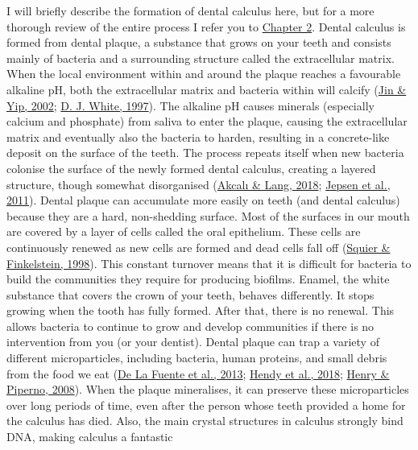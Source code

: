 \documentclass[
  b5paper,
]{book}
\begin{document}
I will briefly describe the formation of dental calculus here, but for a
more thorough review of the entire process I refer you to
\protect\hyperlink{chap-background}{Chapter 2}. Dental calculus is
formed from dental plaque, a substance that grows on your teeth and
consists mainly of bacteria and a surrounding structure called the
extracellular matrix. When the local environment within and around the
plaque reaches a favourable alkaline pH, both the extracellular matrix
and bacteria within will calcify
(\protect\hyperlink{ref-jinSupragingivalCalculus2002}{Jin \& Yip, 2002};
\protect\hyperlink{ref-whiteDentalCalculus1997}{D. J. White, 1997}). The
alkaline pH causes minerals (especially calcium and phosphate) from
saliva to enter the plaque, causing the extracellular matrix and
eventually also the bacteria to harden, resulting in a concrete-like
deposit on the surface of the teeth. The process repeats itself when new
bacteria colonise the surface of the newly formed dental calculus,
creating a layered structure, though somewhat disorganised
(\protect\hyperlink{ref-akcaliDentalCalculus2018}{Akcalı \& Lang, 2018};
\protect\hyperlink{ref-jepsenCalculusRemoval2011}{Jepsen et al., 2011}).
Dental plaque can accumulate more easily on teeth (and dental calculus)
because they are a hard, non-shedding surface. Most of the surfaces in
our mouth are covered by a layer of cells called the oral epithelium.
These cells are continuously renewed as new cells are formed and dead
cells fall off (\protect\hyperlink{ref-squierOralMucosa1998}{Squier \&
Finkelstein, 1998}). This constant turnover means that it is difficult
for bacteria to build the communities they require for producing
biofilms. Enamel, the white substance that covers the crown of your
teeth, behaves differently. It stops growing when the tooth has fully
formed. After that, there is no renewal. This allows bacteria to
continue to grow and develop communities if there is no intervention
from you (or your dentist). Dental plaque can trap a variety of
different microparticles, including bacteria, human proteins, and small
debris from the food we eat
(\protect\hyperlink{ref-delafuenteDNAHuman2013}{De La Fuente et al.,
2013}; \protect\hyperlink{ref-hendyProteomicCalculus2018}{Hendy et al.,
2018}; \protect\hyperlink{ref-henryCalculusSyria2008}{Henry \& Piperno,
2008}). When the plaque mineralises, it can preserve these
microparticles over long periods of time, even after the person whose
teeth provided a home for the calculus has died. Also, the main crystal
structures in calculus strongly bind DNA, making calculus a fantastic
\end{document}
